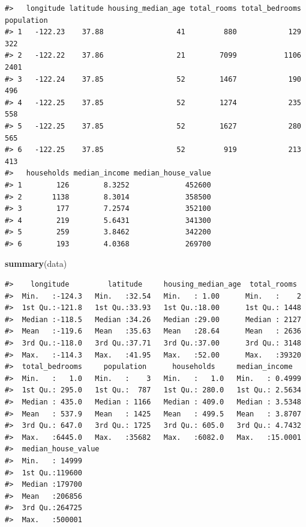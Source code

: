 \documentclass[
]{article}
\newenvironment{Shaded}{\begin{snugshade}}{\end{snugshade}}
\newcommand{\FunctionTok}[1]{\textcolor[rgb]{0.13,0.29,0.53}{\textbf{#1}}}
\newcommand{\NormalTok}[1]{#1}
\begin{document}
\begin{verbatim}
#>   longitude latitude housing_median_age total_rooms total_bedrooms population
#> 1   -122.23    37.88                 41         880            129        322
#> 2   -122.22    37.86                 21        7099           1106       2401
#> 3   -122.24    37.85                 52        1467            190        496
#> 4   -122.25    37.85                 52        1274            235        558
#> 5   -122.25    37.85                 52        1627            280        565
#> 6   -122.25    37.85                 52         919            213        413
#>   households median_income median_house_value
#> 1        126        8.3252             452600
#> 2       1138        8.3014             358500
#> 3        177        7.2574             352100
#> 4        219        5.6431             341300
#> 5        259        3.8462             342200
#> 6        193        4.0368             269700
\end{verbatim}

\begin{Shaded}
\begin{Highlighting}[]
\FunctionTok{summary}\NormalTok{(data)}
\end{Highlighting}
\end{Shaded}

\begin{verbatim}
#>    longitude         latitude     housing_median_age  total_rooms   
#>  Min.   :-124.3   Min.   :32.54   Min.   : 1.00      Min.   :    2  
#>  1st Qu.:-121.8   1st Qu.:33.93   1st Qu.:18.00      1st Qu.: 1448  
#>  Median :-118.5   Median :34.26   Median :29.00      Median : 2127  
#>  Mean   :-119.6   Mean   :35.63   Mean   :28.64      Mean   : 2636  
#>  3rd Qu.:-118.0   3rd Qu.:37.71   3rd Qu.:37.00      3rd Qu.: 3148  
#>  Max.   :-114.3   Max.   :41.95   Max.   :52.00      Max.   :39320  
#>  total_bedrooms     population      households     median_income    
#>  Min.   :   1.0   Min.   :    3   Min.   :   1.0   Min.   : 0.4999  
#>  1st Qu.: 295.0   1st Qu.:  787   1st Qu.: 280.0   1st Qu.: 2.5634  
#>  Median : 435.0   Median : 1166   Median : 409.0   Median : 3.5348  
#>  Mean   : 537.9   Mean   : 1425   Mean   : 499.5   Mean   : 3.8707  
#>  3rd Qu.: 647.0   3rd Qu.: 1725   3rd Qu.: 605.0   3rd Qu.: 4.7432  
#>  Max.   :6445.0   Max.   :35682   Max.   :6082.0   Max.   :15.0001  
#>  median_house_value
#>  Min.   : 14999    
#>  1st Qu.:119600    
#>  Median :179700    
#>  Mean   :206856    
#>  3rd Qu.:264725    
#>  Max.   :500001
\end{verbatim}
\end{document}
